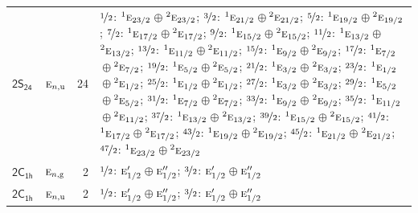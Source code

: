 \documentclass[10pt,a4paper]{article}
\numberwithin{equation}{section}
\newcommand{\grp}[1]{\mathsf{#1}}
\newcommand{\irr}[1]{\text{\normalfont\scshape #1}}
\newcommand{\conjpair}[1]{{}^{#1}}
\newcommand{\ptag}[1]{\mathrm{#1}}
\newlength{\fillwidth}\newlength{\cellwidth}\newlength{\colwidth}
\begin{document}
{\begin{longtable}{@{}llr>{\RaggedRight\arraybackslash}p{\fillwidth}@{}}
\href{2S24.pdf}{$\grp{2S_{24}}$} & $\irr{e}_{n,\ptag{u}}$ & 24 & $\nicefrac{1}{2}$: $\conjpair{1}\irr{e}_{23/2}$${}\oplus{}$$\conjpair{2}\irr{e}_{23/2}$; $\nicefrac{3}{2}$: $\conjpair{1}\irr{e}_{21/2}$${}\oplus{}$$\conjpair{2}\irr{e}_{21/2}$; $\nicefrac{5}{2}$: $\conjpair{1}\irr{e}_{19/2}$${}\oplus{}$$\conjpair{2}\irr{e}_{19/2}$; $\nicefrac{7}{2}$: $\conjpair{1}\irr{e}_{17/2}$${}\oplus{}$$\conjpair{2}\irr{e}_{17/2}$; $\nicefrac{9}{2}$: $\conjpair{1}\irr{e}_{15/2}$${}\oplus{}$$\conjpair{2}\irr{e}_{15/2}$; $\nicefrac{11}{2}$: $\conjpair{1}\irr{e}_{13/2}$${}\oplus{}$$\conjpair{2}\irr{e}_{13/2}$; $\nicefrac{13}{2}$: $\conjpair{1}\irr{e}_{11/2}$${}\oplus{}$$\conjpair{2}\irr{e}_{11/2}$; $\nicefrac{15}{2}$: $\conjpair{1}\irr{e}_{9/2}$${}\oplus{}$$\conjpair{2}\irr{e}_{9/2}$; $\nicefrac{17}{2}$: $\conjpair{1}\irr{e}_{7/2}$${}\oplus{}$$\conjpair{2}\irr{e}_{7/2}$; $\nicefrac{19}{2}$: $\conjpair{1}\irr{e}_{5/2}$${}\oplus{}$$\conjpair{2}\irr{e}_{5/2}$; $\nicefrac{21}{2}$: $\conjpair{1}\irr{e}_{3/2}$${}\oplus{}$$\conjpair{2}\irr{e}_{3/2}$; $\nicefrac{23}{2}$: $\conjpair{1}\irr{e}_{1/2}$${}\oplus{}$$\conjpair{2}\irr{e}_{1/2}$; $\nicefrac{25}{2}$: $\conjpair{1}\irr{e}_{1/2}$${}\oplus{}$$\conjpair{2}\irr{e}_{1/2}$; $\nicefrac{27}{2}$: $\conjpair{1}\irr{e}_{3/2}$${}\oplus{}$$\conjpair{2}\irr{e}_{3/2}$; $\nicefrac{29}{2}$: $\conjpair{1}\irr{e}_{5/2}$${}\oplus{}$$\conjpair{2}\irr{e}_{5/2}$; $\nicefrac{31}{2}$: $\conjpair{1}\irr{e}_{7/2}$${}\oplus{}$$\conjpair{2}\irr{e}_{7/2}$; $\nicefrac{33}{2}$: $\conjpair{1}\irr{e}_{9/2}$${}\oplus{}$$\conjpair{2}\irr{e}_{9/2}$; $\nicefrac{35}{2}$: $\conjpair{1}\irr{e}_{11/2}$${}\oplus{}$$\conjpair{2}\irr{e}_{11/2}$; $\nicefrac{37}{2}$: $\conjpair{1}\irr{e}_{13/2}$${}\oplus{}$$\conjpair{2}\irr{e}_{13/2}$; $\nicefrac{39}{2}$: $\conjpair{1}\irr{e}_{15/2}$${}\oplus{}$$\conjpair{2}\irr{e}_{15/2}$; $\nicefrac{41}{2}$: $\conjpair{1}\irr{e}_{17/2}$${}\oplus{}$$\conjpair{2}\irr{e}_{17/2}$; $\nicefrac{43}{2}$: $\conjpair{1}\irr{e}_{19/2}$${}\oplus{}$$\conjpair{2}\irr{e}_{19/2}$; $\nicefrac{45}{2}$: $\conjpair{1}\irr{e}_{21/2}$${}\oplus{}$$\conjpair{2}\irr{e}_{21/2}$; $\nicefrac{47}{2}$: $\conjpair{1}\irr{e}_{23/2}$${}\oplus{}$$\conjpair{2}\irr{e}_{23/2}$\\
\href{2C1h.pdf}{$\grp{2C_{1h}}$} & $\irr{e}_{n,\ptag{g}}$ & 2 & $\nicefrac{1}{2}$: $\irr{e}_{1/2}'$${}\oplus{}$$\irr{e}_{1/2}''$; $\nicefrac{3}{2}$: $\irr{e}_{1/2}'$${}\oplus{}$$\irr{e}_{1/2}''$\\
\href{2C1h.pdf}{$\grp{2C_{1h}}$} & $\irr{e}_{n,\ptag{u}}$ & 2 & $\nicefrac{1}{2}$: $\irr{e}_{1/2}'$${}\oplus{}$$\irr{e}_{1/2}''$; $\nicefrac{3}{2}$: $\irr{e}_{1/2}'$${}\oplus{}$$\irr{e}_{1/2}''$\\

\end{longtable}}
\end{document}
